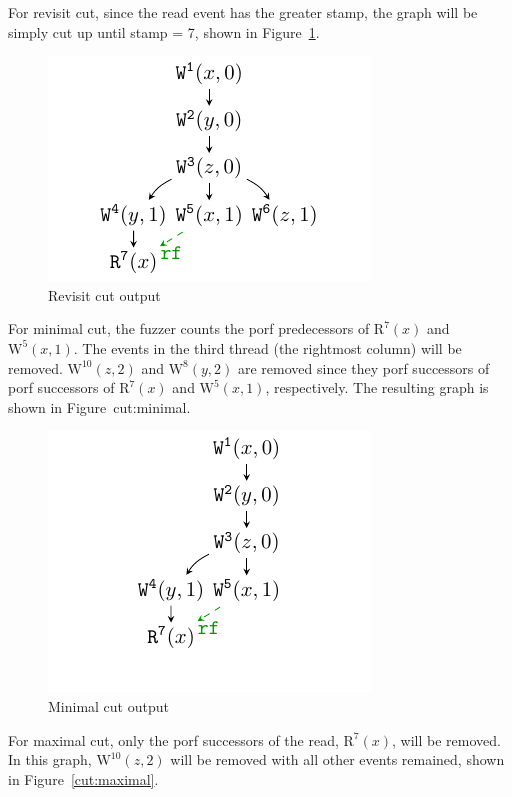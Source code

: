 For revisit cut, since the read event has the greater stamp, the graph will be simply cut up until stamp = 7, shown in Figure~\ref{cut:revisit}.

\begin{figure}[htbp]
	\centering
	\includegraphics[scale=1]{figure/cuts/cut-revisit.pdf}
	\caption{Revisit cut output}
	\label{cut:revisit}
\end{figure}

For minimal cut, the fuzzer counts the porf predecessors of $\text{R}^7(x)$ and $\text{W}^5(x, 1)$. The events in the third thread (the rightmost column) will be removed. $\text{W}^{10}(z, 2)$ and $\text{W}^{8}(y, 2)$ are removed since they porf successors of porf successors of $\text{R}^7(x)$ and $\text{W}^5(x, 1)$, respectively. The resulting graph is shown in Figure~{cut:minimal}.

\begin{figure}[htbp]
	\centering
	\includegraphics[scale=1]{figure/cuts/cut-minimal.pdf}
	\caption{Minimal cut output}
	\label{cut:minimal}
\end{figure}

For maximal cut, only the porf successors of the read, $\text{R}^7(x)$, will be removed. In this graph, $\text{W}^{10}(z, 2)$ will be removed with all other events remained, shown in Figure~\ref{cut:maximal}.

